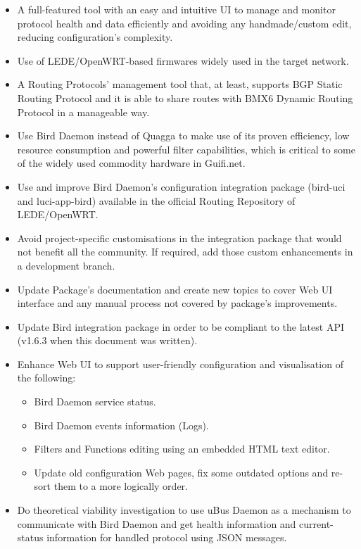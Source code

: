 \begin{itemize}
    \item A full-featured tool with an easy and intuitive UI to manage and monitor protocol health and data efficiently and avoiding any handmade/custom edit, reducing configuration's complexity.
    \item Use of LEDE/OpenWRT-based firmwares widely used in the target network.
    \item A Routing Protocols' management tool that, at least, supports BGP Static Routing Protocol and it is able to share routes with BMX6 Dynamic Routing Protocol in a manageable way.
    \item Use Bird Daemon instead of Quagga to make use of its proven efficiency, low resource consumption and powerful filter capabilities, which is critical to some of the widely used commodity hardware in Guifi.net.
    \item Use and improve Bird Daemon's configuration integration package (bird-uci and luci-app-bird) available in the official Routing Repository of LEDE/OpenWRT.
    \item Avoid project-specific customisations in the integration package that would not benefit all the community. If required, add those custom enhancements in a development branch.
    \item Update Package's documentation and create new topics to cover Web UI interface and any manual process not covered by package's improvements.
    \item Update Bird integration package in order to be compliant to the latest API (v1.6.3 when this document was written).
    \item Enhance Web UI to support user-friendly configuration and visualisation of the following:
    \begin{itemize}
        \item Bird Daemon service status.
        \item Bird Daemon events information (Logs).
        \item Filters and Functions editing using an embedded HTML text editor.
        \item Update old configuration Web pages, fix some outdated options and re-sort them to a more logically order.
    \end{itemize}
    \item Do theoretical viability investigation to use uBus Daemon as a mechanism to communicate with Bird Daemon and get health information and current-status information for handled protocol using JSON messages.
\end{itemize}

